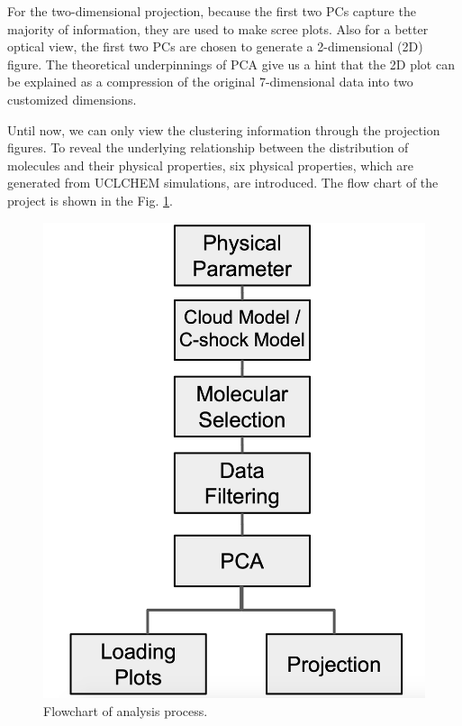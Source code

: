 \documentclass{aa}
\begin{document}
\begin{CJK*}{UTF8}{gbsn}
   For the two-dimensional projection, because the first two PCs capture the majority of information, they are used to make scree plots. Also for a better optical view, the first two PCs are chosen to generate a 2-dimensional (2D) figure. The theoretical underpinnings of PCA give us a hint that the 2D plot can be explained as a compression of the original 7-dimensional data into two customized dimensions. 
 
   Until now, we can only view the clustering information through the projection figures. To reveal the underlying 
   relationship between the distribution of molecules and their physical properties, six physical properties, which are 
   generated from UCLCHEM simulations, are introduced. The flow chart of the project is shown in the Fig. \ref{Fig1}. 
  
  \begin{figure}
   \centering
   \captionsetup{justification=centering}
   \includegraphics[angle=0,scale = 0.3]{flowchart-3.png}
   \caption{Flowchart of analysis process.}
         \label{Fig1}
   \end{figure}


\end{CJK*}
\end{document}
